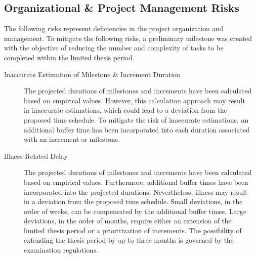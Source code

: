 \subsection{Organizational \& Project Management Risks}
\label{sec:risk_assessment_project_management}
The following risks represent deficiencies in the project organization and management.
To mitigate the following risks, a preliminary milestone was created with the objective of reducing the number and complexity of tasks to be completed within the limited thesis period.
\begin{description}
    \item[Inaccurate Estimation of Milestone \& Increment Duration] The projected durations of milestones and increments have been calculated based on empirical values.
    However, this calculation approach may result in inaccurate estimations, which could lead to a deviation from the proposed time schedule.
    To mitigate the risk of inaccurate estimations, an additional buffer time has been incorporated into each duration associated with an increment or milestone.
    \item[Illness-Related Delay] The projected durations of milestones and increments have been calculated based on empirical values.
    Furthermore, additional buffer times have been incorporated into the projected durations.
    Nevertheless, illness may result in a deviation from the proposed time schedule.
    Small deviations, in the order of weeks, can be compensated by the additional buffer times.
    Large deviations, in the order of months, require either an extension of the limited thesis period or a prioritization of increments.
    The possibility of extending the thesis period by up to three months is governed by the examination regulations.
\end{description}
